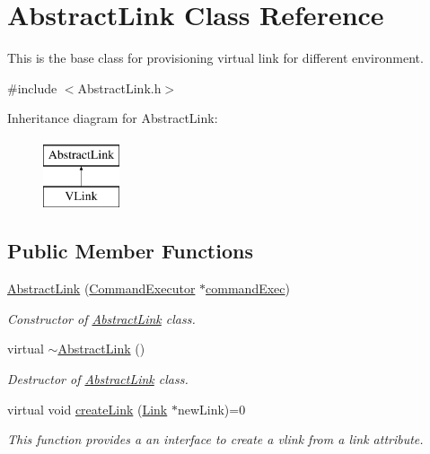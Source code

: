 \hypertarget{classAbstractLink}{\section{\-Abstract\-Link \-Class \-Reference}
\label{classAbstractLink}
}


\-This is the base class for provisioning virtual link for different environment.  




{\ttfamily \#include $<$\-Abstract\-Link.\-h$>$}

\-Inheritance diagram for \-Abstract\-Link\-:\begin{figure}[H]
\begin{center}
\leavevmode
\includegraphics[height=2.000000cm]{classAbstractLink}
\end{center}
\end{figure}
\subsection*{\-Public \-Member \-Functions}
\begin{DoxyCompactItemize}
\item 
\hyperlink{classAbstractLink_ab375caaaecaf65210014af9f57128ebd}{\-Abstract\-Link} (\hyperlink{classCommandExecutor}{\-Command\-Executor} $\ast$\hyperlink{classAbstractLink_a51a304e32addcc90f5c6c5cb150070e2}{command\-Exec})
\begin{DoxyCompactList}\small\item\em \-Constructor of \hyperlink{classAbstractLink}{\-Abstract\-Link} class. \end{DoxyCompactList}\item 
\hypertarget{classAbstractLink_a4784615a938046dffaf6b93457ea266d}{virtual \hyperlink{classAbstractLink_a4784615a938046dffaf6b93457ea266d}{$\sim$\-Abstract\-Link} ()}\label{classAbstractLink_a4784615a938046dffaf6b93457ea266d}

\begin{DoxyCompactList}\small\item\em \-Destructor of \hyperlink{classAbstractLink}{\-Abstract\-Link} class. \end{DoxyCompactList}\item 
virtual void \hyperlink{classAbstractLink_a7ccb9603a75fbf87e2bc5347bd1bfc9b}{create\-Link} (\hyperlink{classLink}{\-Link} $\ast$new\-Link)=0
\begin{DoxyCompactList}\small\item\em \-This function provides a an interface to create a vlink from a link attribute. \end{DoxyCompactList}\end{DoxyCompactItemize}
